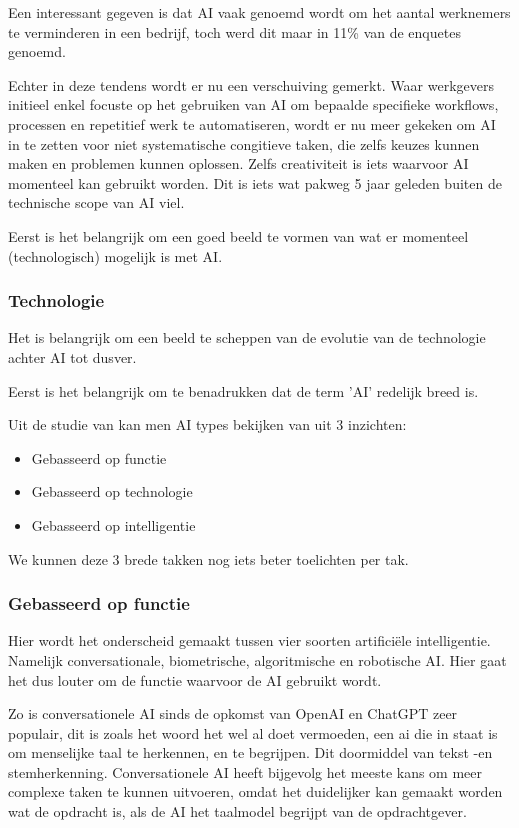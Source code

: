 Een interessant gegeven is dat AI vaak genoemd wordt om het aantal werknemers te verminderen in een bedrijf, toch werd dit maar in 11\% van de enquetes genoemd. 

Echter in deze tendens wordt er nu een verschuiving gemerkt. Waar werkgevers initieel enkel focuste op het gebruiken van AI om bepaalde specifieke workflows, processen en repetitief werk te automatiseren, wordt er nu meer gekeken om AI in te zetten voor niet systematische congitieve taken, die zelfs keuzes kunnen maken en problemen kunnen oplossen. Zelfs creativiteit is iets waarvoor AI momenteel kan gebruikt worden. Dit is iets wat pakweg 5 jaar geleden buiten de technische scope van AI viel. 

Eerst is het belangrijk om een goed beeld te vormen van wat er momenteel (technologisch) mogelijk is met AI.

\subsubsection{Technologie}
Het is belangrijk om een beeld te scheppen van de evolutie van de technologie achter AI tot dusver.

Eerst is het belangrijk om te benadrukken dat de term 'AI' redelijk breed is.

Uit de studie van \cite{benbya2020artificial} kan men AI types bekijken van uit 3 inzichten:
\begin{itemize}
    \item Gebasseerd op functie
    \item Gebasseerd op technologie
    \item Gebasseerd op intelligentie
\end{itemize}

We kunnen deze 3 brede takken nog iets beter toelichten per tak.

\subsubsection{Gebasseerd op functie}

    Hier wordt het onderscheid gemaakt tussen vier soorten artificiële intelligentie. Namelijk conversationale, biometrische, algoritmische en robotische AI. Hier gaat het dus louter om de functie waarvoor de AI gebruikt wordt. 
    
    Zo is conversationele AI sinds de opkomst van OpenAI en ChatGPT zeer populair, dit is zoals het woord het wel al doet vermoeden, een ai die in staat is om menselijke taal te herkennen, en te begrijpen. Dit doormiddel van tekst -en stemherkenning. Conversationele AI heeft bijgevolg het meeste kans om meer complexe taken te kunnen uitvoeren, omdat het duidelijker kan gemaakt worden wat de opdracht is, als de AI het taalmodel begrijpt van de opdrachtgever.
    
